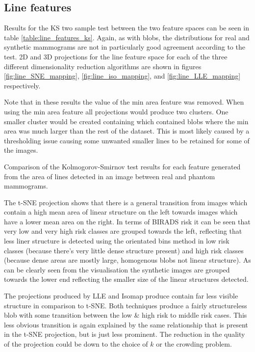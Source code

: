 \subsection{Line features}
Results for the KS two sample test between the two feature spaces can be seen in table \ref{table:line_features_ks}. Again, as with blobs, the distributions for real and synthetic mammograms are not in particularly good agreement according to the test. 2D and 3D projections for the line feature space for each of the three different dimensionality reduction algorithms are shown in figures \ref{fig:line_SNE_mapping}, \ref{fig:line_iso_mapping}, and \ref{fig:line_LLE_mapping} respectively.
 
Note that in these results the value of the min area feature was removed. When using the min area feature all projections would produce two clusters. One smaller cluster would be created containing which contained blobs where the min area was much larger than the rest of the dataset. This is most likely caused by a thresholding issue causing some unwanted smaller lines to be retained for some of the images.

\begin{table}[H]
\label{table:line_features_ks}
\centering
{}
\caption{Comparison of the Kolmogorov-Smirnov test results for each feature generated from the area of lines detected in an image between real and phantom mammograms.}
\end{table}

The t-SNE projection shows that there is a general transition from images which contain a high mean area of linear structure on the left towards images which have a lower mean area on the right. In terms of BIRADS risk it can be seen that very low and very high risk classes are grouped towards the left, reflecting that less liner structure is detected using the orientated bins method in low risk classes (because there's very little dense structure present) and high risk classes (because dense areas are mostly large, homogenous blobs not linear structure). As can be clearly seen from the visualisation the synthetic images are grouped towards the lower end reflecting the smaller size of the linear structures detected. 

The projections produced by LLE and Isomap produce contain far less visible structure in comparison to t-SNE. Both techniques produce a fairly structureless blob with some transition between the low \& high risk to middle risk cases. This less obvious transition is again explained by the same relationship that is present in the t-SNE projection, but is just less prominent. The reduction in the quality of the projection could be down to the choice of $k$ or the crowding problem.

